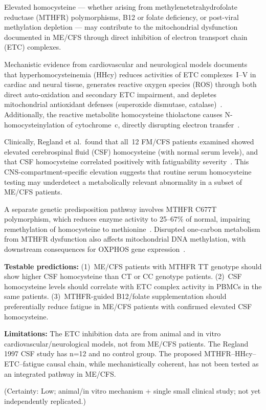 \begin{hypothesis}
\label{hyp:homocysteine-etc-disruption}
Elevated homocysteine --- whether arising from methylenetetrahydrofolate reductase (MTHFR) polymorphisms,
B12 or folate deficiency, or post-viral methylation depletion --- may contribute to the mitochondrial
dysfunction documented in ME/CFS through direct inhibition of electron transport chain (ETC) complexes.

Mechanistic evidence from cardiovascular and neurological models documents that
hyperhomocysteinemia (HHcy) reduces activities of ETC complexes~I--V in cardiac and neural tissue,
generates reactive oxygen species (ROS) through both direct auto-oxidation and secondary ETC impairment,
and depletes mitochondrial antioxidant defenses (superoxide dismutase, catalase)~\cite{Kaplan2020}.
Additionally, the reactive metabolite homocysteine thiolactone causes N-homocysteinylation of
cytochrome~c, directly disrupting electron transfer~\cite{Kaplan2020}.

Clinically, Regland et al.\ found that all~12 FM/CFS patients examined showed elevated cerebrospinal
fluid (CSF) homocysteine (with normal serum levels), and that CSF homocysteine correlated positively
with fatiguability severity~\cite{Regland1997}. This CNS-compartment-specific elevation suggests
that routine serum homocysteine testing may underdetect a metabolically relevant abnormality in a
subset of ME/CFS patients.

A separate genetic predisposition pathway involves MTHFR C677T polymorphism, which reduces enzyme
activity to 25--67\% of normal, impairing remethylation of homocysteine to methionine~\cite{Zarembska2023}.
Disrupted one-carbon metabolism from MTHFR dysfunction also affects mitochondrial DNA methylation,
with downstream consequences for OXPHOS gene expression~\cite{Zarembska2023}.

\textbf{Testable predictions:} (1)~ME/CFS patients with MTHFR TT genotype should show higher CSF
homocysteine than CT or CC genotype patients. (2)~CSF homocysteine levels should correlate with
ETC complex activity in PBMCs in the same patients. (3)~MTHFR-guided B12/folate supplementation
should preferentially reduce fatigue in ME/CFS patients with confirmed elevated CSF homocysteine.

\textbf{Limitations:} The ETC inhibition data are from animal and in vitro cardiovascular/neurological
models, not from ME/CFS patients. The Regland 1997 CSF study has n=12 and no control group. The
proposed MTHFR--HHcy--ETC--fatigue causal chain, while mechanistically coherent, has not been
tested as an integrated pathway in ME/CFS.

(Certainty: Low; animal/in vitro mechanism + single small clinical study; not yet independently replicated.)
\end{hypothesis}

